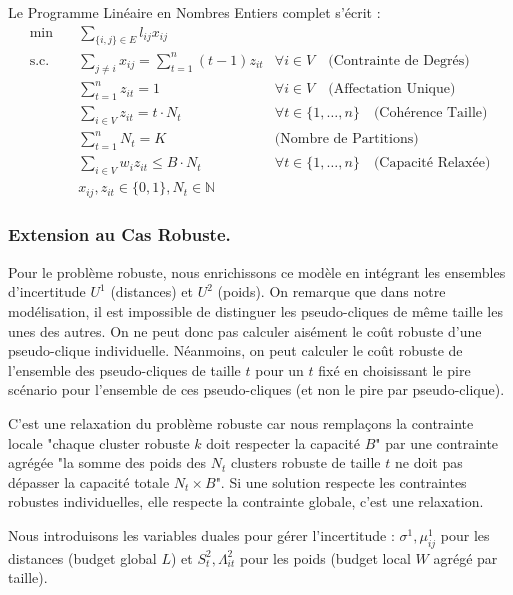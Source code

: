 \documentclass{article}
\begin{document}
Le Programme Linéaire en Nombres Entiers complet s'écrit :
\begin{align*}
    \min \quad & \sum_{\{i,j\} \in E} l_{ij} x_{ij} \\
    \text{s.c.} \quad & \sum_{j \neq i} x_{ij} = \sum_{t=1}^n (t-1) z_{it} & \forall i \in V \quad \text{(Contrainte de Degrés)} \\
    & \sum_{t=1}^n z_{it} = 1 & \forall i \in V \quad \text{(Affectation Unique)} \\
    & \sum_{i \in V} z_{it} = t \cdot N_t & \forall t \in \{1,\dots,n\} \quad \text{(Cohérence Taille)} \\
    & \sum_{t=1}^n N_t = K & \text{(Nombre de Partitions)} \\
    & \sum_{i \in V} w_i z_{it} \le B \cdot N_t & \forall t \in \{1,\dots,n\} \quad \text{(Capacité Relaxée)} \\
    & x_{ij}, z_{it} \in \{0,1\}, N_t \in \mathbb{N}
\end{align*}

\subsubsection*{Extension au Cas Robuste.}
Pour le problème robuste, nous enrichissons ce modèle en intégrant les ensembles d'incertitude $U^1$ (distances) et $U^2$ (poids).
On remarque que dans notre modélisation, il est impossible de distinguer les pseudo-cliques de même taille les unes des autres. On ne peut donc pas calculer aisément le coût robuste d'une pseudo-clique individuelle. Néanmoins, on peut calculer le coût robuste de l'ensemble des pseudo-cliques de taille $t$ pour un $t$ fixé en choisissant le pire scénario pour l'ensemble de ces pseudo-cliques (et non le pire par pseudo-clique).

C'est une relaxation du problème robuste car nous remplaçons la contrainte locale "chaque cluster robuste $k$ doit respecter la capacité $B$" par une contrainte agrégée "la somme des poids des $N_t$ clusters robuste de taille $t$ ne doit pas dépasser la capacité totale $N_t \times B$". Si une solution respecte les contraintes robustes individuelles, elle respecte la contrainte globale, c'est une relaxation.

Nous introduisons les variables duales pour gérer l'incertitude : $\sigma^1, \mu_{ij}^1$ pour les distances (budget global $L$) et $S^2_t, \Lambda^2_{it}$ pour les poids (budget local $W$ agrégé par taille).
\end{document}
